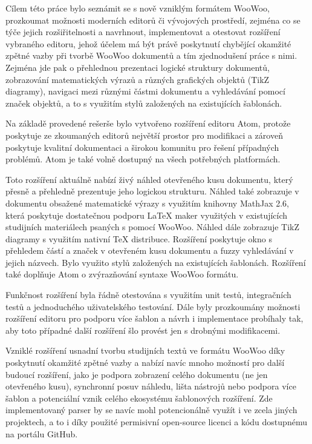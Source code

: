 Cílem této práce bylo seznámit se s nově vzniklým formátem WooWoo, prozkoumat možnosti moderních editorů či vývojových
prostředí, zejména co se týče jejich rozšiřitelnosti a navrhnout, implementovat a otestovat rozšíření vybraného editoru,
jehož účelem má být právě poskytnutí chybějící okamžité zpětné vazby při tvorbě WooWoo dokumentů a tím zjednodušení
práce s nimi. Zejména jde pak o přehlednou prezentaci logické struktury dokumentů, zobrazování matematických výrazů a
různých grafických objektů (TikZ diagramy), navigaci mezi různými částmi dokumentu a vyhledávání pomocí značek objektů,
a to s využitím stylů založených na existujících šablonách.

Na základě provedené rešerše bylo vytvořeno rozšíření editoru Atom, protože poskytuje ze zkoumaných editorů největší
prostor pro modifikaci a zároveň poskytuje kvalitní dokumentaci a širokou komunitu pro řešení případných problémů. Atom
je také volně dostupný na všech potřebných platformách.

Toto rozšíření aktuálně nabízí živý náhled otevřeného kusu dokumentu, který přesně a přehledně prezentuje jeho logickou
strukturu. Náhled také zobrazuje v dokumentu obsažené matematické výrazy s využitím knihovny MathJax 2.6, která
poskytuje dostatečnou podporu \LaTeX{} maker využitých v existujících studijních materiálech psaných s pomocí WooWoo.
Náhled dále zobrazuje TikZ diagramy s využitím nativní \TeX{} distribuce. Rozšíření poskytuje okno s přehledem částí a
značek v otevřeném kusu dokumentu a fuzzy vyhledávání v jejich názvech. Bylo využito stylů založených na existujících
šablonách. Rozšíření také doplňuje Atom o zvýrazňování syntaxe WooWoo formátu.

Funkčnost rozšíření byla řádně otestována s využitím unit testů, integračních testů a jednoduchého uživatelského
testování. Dále byly prozkoumány možnosti rozšíření editoru pro podporu více šablon a návrh i implementace probíhaly
tak, aby toto případné další rozšíření šlo provést jen s drobnými modifikacemi.

Vzniklé rozšíření usnadní tvorbu studijních textů ve formátu WooWoo díky poskytnutí okamžité zpětné vazby a nabízí navíc
mnoho možností pro další budoucí rozšíření, jako je podpora zobrazení celého dokumentu (ne jen otevřeného kusu),
synchronní posuv náhledu, lišta nástrojů nebo podpora více šablon a potenciální vznik celého ekosystému šablonových
rozšíření. Zde implementovaný parser by se navíc mohl potencionálně využít i ve zcela jiných projektech, a to i díky
použité permisivní open-source licenci a kódu dostupnému na portálu GitHub.
